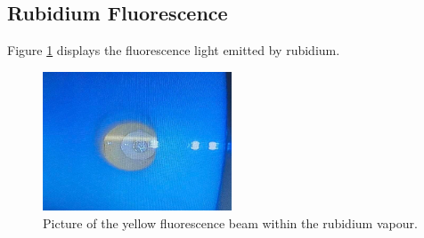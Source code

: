 \subsection{Rubidium Fluorescence}
Figure \ref{fig:fluorescence} displays the fluorescence light
emitted by rubidium. 
\begin{figure}
    \centering
    \includegraphics[width=0.5\textwidth]{pictures/Strahl.jpeg}
    \caption{Picture of the yellow fluorescence beam within the rubidium vapour.}
    \label{fig:fluorescence}
\end{figure}

